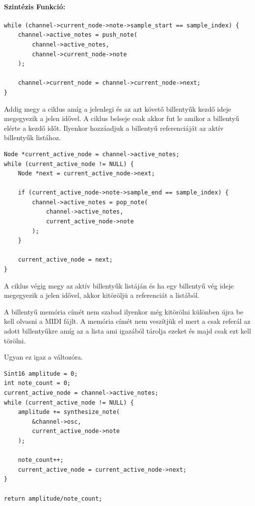 \documentclass{article}
\begin{document}
\paragraph{Szintézis Funkció:}
\begin{lstlisting}[caption={
    \code{synthesize_channel()} funkció aktív billentyű keresés
}]
while (channel->current_node->note->sample_start == sample_index) {
    channel->active_notes = push_note(
        channel->active_notes, 
        channel->current_node->note
    );

    channel->current_node = channel->current_node->next;
}
\end{lstlisting}

Addig megy a ciklus amíg a jelenlegi és az azt követő billentyűk 
kezdő ideje megegyezik a jelen idővel.
A ciklus belseje csak akkor fut le amikor a billentyű elérte a kezdő 
időt. Ilyenkor hozzáadjuk a billentyű referenciáját az aktív 
billentyűk listához.

\begin{lstlisting}[caption={
    \code{synthesize_channel()} funkció aktív billentyű törlés
}]
Node *current_active_node = channel->active_notes;
while (current_active_node != NULL) {
    Node *next = current_active_node->next;

    if (current_active_node->note->sample_end == sample_index) {
        channel->active_notes = pop_note(
            channel->active_notes,
            current_active_node->note
        );
    }

    current_active_node = next;
}
\end{lstlisting}

A ciklus végig megy az aktív billentyűk listáján és ha egy 
billentyű vég ideje megegyezik a jelen idővel, akkor kitöröljü
a referenciát a listából.

\begin{cnote}[Megjegyzés:]
    A billentyű memória címét nem szabad ilyenkor még kitörölni 
    különben újra be kell olvasni a MIDI fájlt.
    A memória címét nem veszítjük el mert a 
     csak referál az adott 
    billentyűkre amíg  az a lista 
    ami igazából tárolja ezeket és majd csak ezt kell törölni.

    Ugyan ez igaz a  változóra.
\end{cnote}

\begin{lstlisting}[caption={
    \code{synthesize_channel()} funkció aktív 
    billentyűk szintetizálása 
}]
Sint16 amplitude = 0;
int note_count = 0;
current_active_node = channel->active_notes;
while (current_active_node != NULL) {
    amplitude += synthesize_note(
        &channel->osc,
        current_active_node->note
    );

    note_count++;
    current_active_node = current_active_node->next;
}

return amplitude/note_count;
\end{lstlisting}
\end{document}
